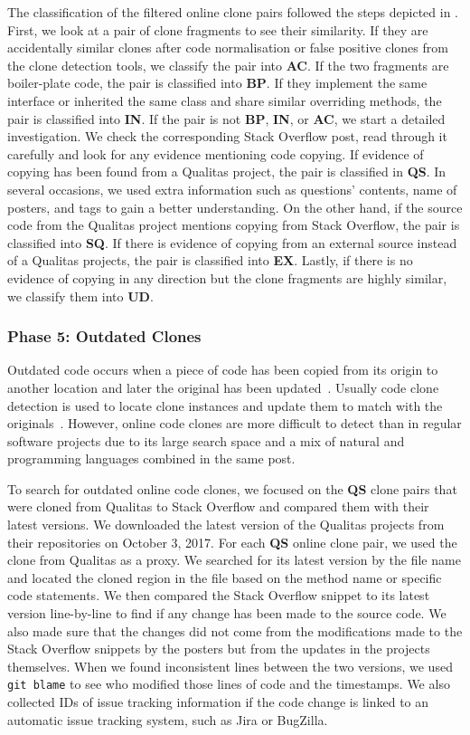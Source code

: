 \documentclass[10pt,journal,compsoc]{IEEEtran}
\begin{document}
The classification of the filtered online clone pairs followed the steps
depicted in . First, we look at a pair of clone
fragments to see their similarity. If they are accidentally similar clones after
code normalisation or false positive clones from the clone detection tools, we
classify the pair into \textbf{AC}. If the two fragments are boiler-plate code,
the pair is classified into \textbf{BP}. If they implement the same interface or
inherited the same class and share similar overriding methods, the pair is
classified into \textbf{IN}. If the pair is not \textbf{BP}, \textbf{IN}, or
\textbf{AC}, we start a detailed investigation. We check the corresponding Stack
Overflow post, read through it carefully and look for any evidence mentioning
code copying. If evidence of copying has been found from a Qualitas project, the
pair is classified in \textbf{QS}. In several occasions, we used extra
information such as questions' contents, name of posters, and tags to gain a
better understanding. On the other hand, if the source code from the Qualitas
project mentions copying from Stack Overflow, the pair is classified into
\textbf{SQ}. If there is evidence of copying from an external source instead of
a Qualitas projects, the pair is classified into \textbf{EX}. Lastly, if there
is no evidence of copying in any direction but the clone fragments are highly
similar, we classify them into \textbf{UD}.

\subsubsection{Phase 5: Outdated Clones} Outdated code occurs when a piece of code
has been copied from its origin to another location and later the original has
been updated~\cite{Xia2014}. Usually code clone detection is used to locate
clone instances and update them to match with the originals~\cite{Bellon2007}.
However, online code clones are more difficult to detect than in regular
software projects due to its large search space and a mix of natural and
programming languages combined in the same post.

To search for outdated online code clones, we focused on the \textbf{QS} clone
pairs that were cloned from Qualitas to Stack Overflow and compared them with
their latest versions. We downloaded the latest version of the Qualitas projects
from their repositories on October 3, 2017. For each \textbf{QS} online clone
pair, we used the clone from Qualitas as a proxy. We searched for its latest
version by the file name and located the cloned region in the file based on the
method name or specific code statements. We then compared the Stack Overflow
snippet to its latest version line-by-line to find if any change has been made
to the source code. We also made sure that the changes did not come from the
modifications made to the Stack Overflow snippets by the posters but from the
updates in the projects themselves. When we found inconsistent lines between the
two versions, we used {\small\texttt{git blame}} to see who modified those lines
of code and the timestamps. We also collected IDs of issue tracking information
if the code change is linked to an automatic issue tracking system, such as Jira
or BugZilla.
\end{document}
